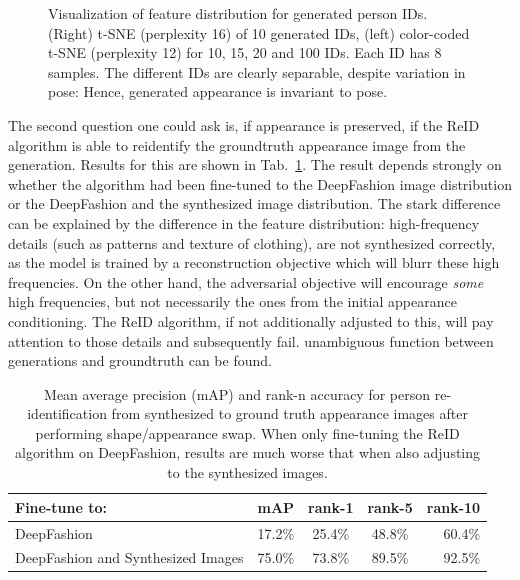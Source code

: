 \begin{figure}[htp]
			\caption{Visualization of feature distribution for generated person IDs. (Right) t-SNE (perplexity 16) of 10 generated IDs, (left) color-coded t-SNE (perplexity 12) for 10, 15, 20 and 100 IDs. Each ID has 8 samples. The different IDs are clearly separable, despite variation in pose: Hence, generated appearance is invariant to pose.}
			\label{fig:tsne}
		\end{figure}

		The second question one could ask is, if appearance is preserved, \ie if the ReID algorithm is able to reidentify the groundtruth appearance image from the generation. Results for this are shown in Tab.~\ref{tab:reiddirect}. The result depends strongly on whether the algorithm had been fine-tuned to the DeepFashion image distribution or the DeepFashion and the synthesized image distribution. The stark difference can be explained by the difference in the feature distribution: high-frequency details (such as patterns and texture of clothing), are not synthesized correctly, as the model is trained by a reconstruction objective which will blurr these high frequencies. On the other hand, the adversarial objective will encourage \textit{some} high frequencies, but not necessarily the ones from the initial appearance conditioning. The ReID algorithm, if not additionally adjusted to this, will pay attention to those details and subsequently fail.
		unambiguous function between generations and groundtruth can be found.

		\begin{table}[htp]
			\centering
			\caption{Mean average precision (mAP) and rank-n accuracy for person re-identification from synthesized to ground truth appearance images after performing shape/appearance swap. When only fine-tuning the ReID algorithm on DeepFashion, results are much worse that when also adjusting to the synthesized images.}
			\label{tab:reiddirect}
			\begin{tabular}{l|cccr}
				\hline
				Fine-tune to: & mAP & rank-1 & rank-5 & rank-10 \\ \hline
				DeepFashion & {17.2}\% & {25.4}\% &{48.8}\% & {60.4}\% \\
				DeepFashion and Synthesized Images& {75.0}\% & {73.8}\% &{89.5}\% & {92.5}\% \\ \hline
			\end{tabular}
		\end{table}



